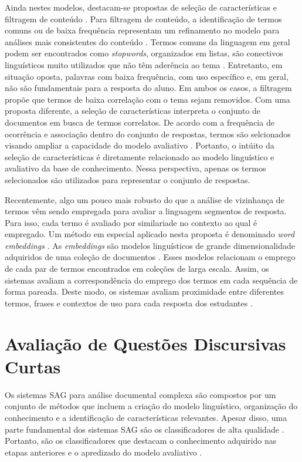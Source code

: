 Ainda nestes modelos, destacam-se propostas de seleção de características e filtragem de conteúdo \cite{higgins2014, spalenza2016a}. Para filtragem de conteúdo, a identificação de termos comuns ou de baixa frequência representam um refinamento no modelo para análises mais consistentes do conteúdo \cite{zhang2020, marvaniya2018}. Termos comuns da linguagem em geral podem ser encontrados como \textit{stopwords}, organizados em listas, são conectivos linguísticos muito utilizados que não têm aderência ao tema \cite{jurafsky2009}. Entretanto, em situação oposta, palavras com baixa frequência, com uso específico e, em geral, não são fundamentais para a resposta do aluno. Em ambos os casos, a filtragem propõe que termos de baixa correlação com o tema sejam removidos. Com uma proposta diferente, a seleção de características interpreta o conjunto de documentos em busca de termos correlatos. De acordo com a frequência de ocorrência e associação dentro do conjunto de respostas, termos são selcionados visando ampliar a capacidade do modelo avaliativo \cite{krithika2015, spalenza2016b, horbach2018}. Portanto, o intúito da seleção de características é diretamente relacionado ao modelo linguístico e avaliativo da base de conhecimento. Nessa perspectiva, apenas os termos selecionados são utilizados para representar o conjunto de respostas.

Recentemente, algo um pouco mais robusto do que a análise de vizinhança de termos vêm sendo empregada para avaliar a linguagem segmentos de resposta. Para isso, cada termo é avaliado por similariade no contexto ao qual é empregado. Um método em especial aplicado nesta proposta é denominado \textit{word embeddings} \cite{sung2019b, ghavidel2020}. As \textit{embeddings} são modelos linguísticos de grande dimensionalidade adquiridos de uma coleção de documentos \cite{goldberg2017}. Esses modelos relacionam o emprego de cada par de termos encontrados em coleções de larga escala. Assim, os sistemas avaliam a correspondência do emprego dos termos em cada sequência de forma pareada. Deste modo, os sistemas avaliam proximidade entre diferentes termos, frases e contextos de uso para cada resposta dos estudantes \cite{riordan2017}.

\section{Avaliação de Questões Discursivas Curtas}

Os sistemas SAG para análise documental complexa são compostos por um conjunto de métodos que incluem a criação do modelo linguístico, organização do conhecimento e a identificação de características relevantes. Apesar disso, uma parte fundamental dos sistemas SAG são os classificadores de alta qualidade \cite{funayama2020}. Portanto, são os classificadores que destacam o conhecimento adquirido nas etapas anteriores e o apredizado do modelo avaliativo \cite{mohler2011}.

